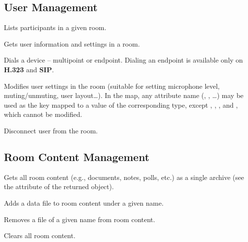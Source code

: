 \subsection{User Management}
\begin{Api}

Lists participants in a given room.

Gets user information and settings in a room.

Dials a device -- multipoint or endpoint. Dialing an endpoint is available only on \textbf{H.323} and \textbf{SIP}.

Modifies user settings in the room (suitable for setting microphone level, muting/unmuting, user layout\ldots). In the  map, any  attribute name (, , \ldots) may be used as the key mapped to a value of the corresponding type, except , , , and , which cannot be modified.

Disconnect user from the room.

\end{Api}


\subsection{Room Content Management}
\begin{Api}

Gets all room content (e.g., documents, notes, polls, etc.) as a single archive (see the  attribute of the returned object).

Adds a data file to room content under a given name.

Removes a file of a given name from room content.

Clears all room content.

\end{Api}


